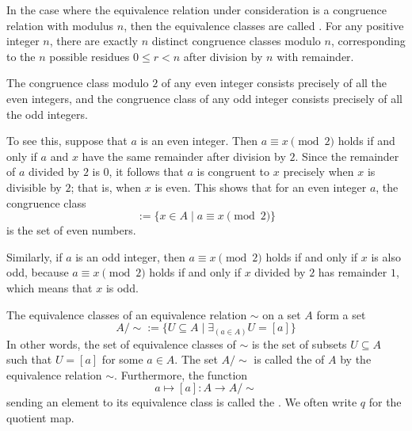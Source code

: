 \begin{example}
  In the case where the equivalence relation under consideration is a congruence relation with modulus $n$, then the equivalence classes are called . For any positive integer $n$, there are exactly $n$ distinct congruence classes modulo $n$, corresponding to the $n$ possible residues $0\leq r<n$ after division by $n$ with remainder.

  The congruence class modulo $2$ of any even integer consists precisely of all the even integers, and the congruence class of any odd integer consists precisely of all the odd integers.

  To see this, suppose that $a$ is an even integer. Then $a \equiv x\pmod{2}$ holds if and only if $a$ and $x$ have the same remainder after division by $2$. Since the remainder of $a$ divided by $2$ is $0$, it follows that $a$ is congruent to $x$ precisely when $x$ is divisible by $2$; that is, when $x$ is even. This shows that for an even integer $a$, the congruence class
  \begin{equation*}
    [a] := \{x\in A \mid a \equiv x\pmod {2}\}
  \end{equation*}
  is the set of even numbers.

  Similarly, if $a$ is an odd integer, then $a\equiv x\pmod{2}$ holds if and only if $x$ is also odd, because $a\equiv x\pmod{2}$ holds if and only if $x$ divided by $2$ has remainder $1$, which means that $x$ is odd.
\end{example}

The equivalence classes of an equivalence relation $\sim$ on a set $A$ form a set
\begin{equation*}
  A/{\sim} := \{U\subseteq A \mid \exists_{(a\in A)}U=[a]\}
\end{equation*}
In other words, the set of equivalence classes of $\sim$ is the set of subsets $U\subseteq A$ such that $U=[a]$ for some $a\in A$. The set $A/{\sim}$ is called the  of $A$ by the equivalence relation $\sim$. Furthermore, the function
\begin{equation*}
  a\mapsto [a]:A\to A/{\sim}
\end{equation*}
sending an element to its equivalence class is called the . We often write $q$ for the quotient map.

